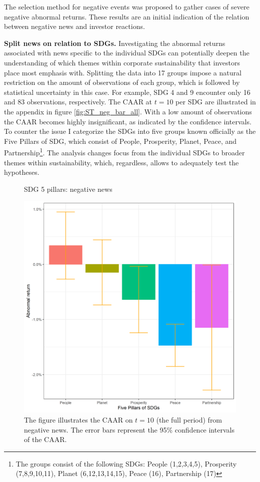 The selection method for negative events was proposed to gather cases of severe negative abnormal returns. These results are an initial indication of the relation between negative news and investor reactions. 

\noindent \textbf{Split news on relation to SDGs.} Investigating the abnormal returns associated with news specific to the individual SDGs can potentially deepen the understanding of which themes within corporate sustainability that investors place most emphasis with. Splitting the data into 17 groups impose a natural restriction on the amount of observations of each group, which is followed by statistical uncertainty in this case. For example, SDG 4 and 9 encounter only 16 and 83 observations, respectively. The CAAR at $t=10$ per SDG are illustrated in the appendix in figure \ref{fig:ST_neg_bar_all}. With a low amount of observations the CAAR becomes highly insignificant, as indicated by the confidence intervals. To counter the issue I categorize the SDGs into five groups known officially as the Five Pillars of SDG, which consist of People, Prosperity, Planet, Peace, and Partnership\footnote{The groups consist of the following SDGs: People (1,2,3,4,5), Prosperity (7,8,9,10,11), Planet (6,12,13,14,15), Peace (16), Partnership (17)}. The analysis changes focus from the individual SDGs to broader themes within sustainability, which, regardless, allows to adequately test the hypotheses.

\begin{figure} [H]
    \centering
    \caption{SDG 5 pillars: negative news}
    \includegraphics[scale=0.6]{Projekt/1.Figures analysis/ST_negative_sdg_bar_groups_0.png}
    \caption*{\footnotesize The figure illustrates the CAAR on $t = 10$ (the full period) from negative news. The error bars represent the 95\% confidence intervals of the CAAR.}
    \label{fig:ST_neg_bar}
\end{figure}



